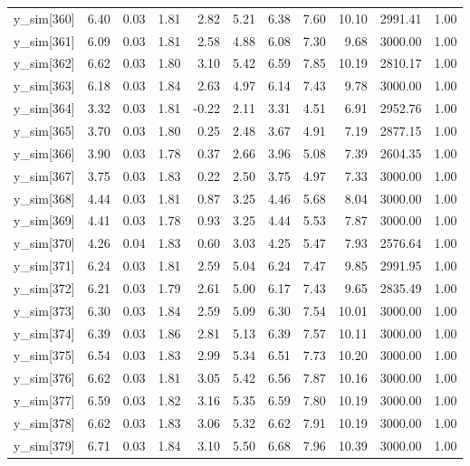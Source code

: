\begin{table}[ht]
\begin{tabular}{rrrrrrrrrrr}
  y\_sim[360] & 6.40 & 0.03 & 1.81 & 2.82 & 5.21 & 6.38 & 7.60 & 10.10 & 2991.41 & 1.00 \\ 
  y\_sim[361] & 6.09 & 0.03 & 1.81 & 2.58 & 4.88 & 6.08 & 7.30 & 9.68 & 3000.00 & 1.00 \\ 
  y\_sim[362] & 6.62 & 0.03 & 1.80 & 3.10 & 5.42 & 6.59 & 7.85 & 10.19 & 2810.17 & 1.00 \\ 
  y\_sim[363] & 6.18 & 0.03 & 1.84 & 2.63 & 4.97 & 6.14 & 7.43 & 9.78 & 3000.00 & 1.00 \\ 
  y\_sim[364] & 3.32 & 0.03 & 1.81 & -0.22 & 2.11 & 3.31 & 4.51 & 6.91 & 2952.76 & 1.00 \\ 
  y\_sim[365] & 3.70 & 0.03 & 1.80 & 0.25 & 2.48 & 3.67 & 4.91 & 7.19 & 2877.15 & 1.00 \\ 
  y\_sim[366] & 3.90 & 0.03 & 1.78 & 0.37 & 2.66 & 3.96 & 5.08 & 7.39 & 2604.35 & 1.00 \\ 
  y\_sim[367] & 3.75 & 0.03 & 1.83 & 0.22 & 2.50 & 3.75 & 4.97 & 7.33 & 3000.00 & 1.00 \\ 
  y\_sim[368] & 4.44 & 0.03 & 1.81 & 0.87 & 3.25 & 4.46 & 5.68 & 8.04 & 3000.00 & 1.00 \\ 
  y\_sim[369] & 4.41 & 0.03 & 1.78 & 0.93 & 3.25 & 4.44 & 5.53 & 7.87 & 3000.00 & 1.00 \\ 
  y\_sim[370] & 4.26 & 0.04 & 1.83 & 0.60 & 3.03 & 4.25 & 5.47 & 7.93 & 2576.64 & 1.00 \\ 
  y\_sim[371] & 6.24 & 0.03 & 1.81 & 2.59 & 5.04 & 6.24 & 7.47 & 9.85 & 2991.95 & 1.00 \\ 
  y\_sim[372] & 6.21 & 0.03 & 1.79 & 2.61 & 5.00 & 6.17 & 7.43 & 9.65 & 2835.49 & 1.00 \\ 
  y\_sim[373] & 6.30 & 0.03 & 1.84 & 2.59 & 5.09 & 6.30 & 7.54 & 10.01 & 3000.00 & 1.00 \\ 
  y\_sim[374] & 6.39 & 0.03 & 1.86 & 2.81 & 5.13 & 6.39 & 7.57 & 10.11 & 3000.00 & 1.00 \\ 
  y\_sim[375] & 6.54 & 0.03 & 1.83 & 2.99 & 5.34 & 6.51 & 7.73 & 10.20 & 3000.00 & 1.00 \\ 
  y\_sim[376] & 6.62 & 0.03 & 1.81 & 3.05 & 5.42 & 6.56 & 7.87 & 10.16 & 3000.00 & 1.00 \\ 
  y\_sim[377] & 6.59 & 0.03 & 1.82 & 3.16 & 5.35 & 6.59 & 7.80 & 10.19 & 3000.00 & 1.00 \\ 
  y\_sim[378] & 6.62 & 0.03 & 1.83 & 3.06 & 5.32 & 6.62 & 7.91 & 10.19 & 3000.00 & 1.00 \\ 
  y\_sim[379] & 6.71 & 0.03 & 1.84 & 3.10 & 5.50 & 6.68 & 7.96 & 10.39 & 3000.00 & 1.00 \\ 

\end{tabular}
\end{table}
